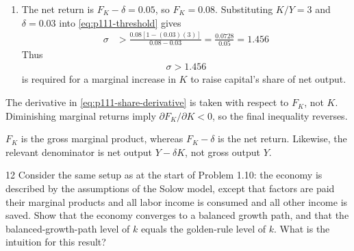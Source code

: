 \begin{solution}
\begin{enumerate}[label=(\alph*)]
    \item The net return is \(F_K-\delta=0.05\), so
    \(F_K=0.08\). Substituting \(K/Y=3\) and \(\delta=0.03\) into
    \eqref{eq:p111-threshold} gives
    \begin{align*}
        \sigma
        &>\frac{0.08[1-(0.03)(3)]}{0.08-0.03}
        =\frac{0.0728}{0.05}
        =1.456
    \end{align*}
    Thus
    \begin{align*}
        \boxed{\sigma>1.456}
    \end{align*}
    is required for a marginal increase in \(K\) to raise capital's share of
    net output.
\end{enumerate}
\end{solution}

\begin{note}
    The derivative in \eqref{eq:p111-share-derivative} is taken with respect
    to \(F_K\), not \(K\). Diminishing marginal returns imply
    \(\partial F_K/\partial K<0\), so the final inequality reverses.
\end{note}

\begin{note}
    \(F_K\) is the gross marginal product, whereas \(F_K-\delta\) is the net
    return. Likewise, the relevant denominator is net output \(Y-\delta K\),
    not gross output \(Y\).
\end{note}

\begin{problem}{12}
Consider the same setup as at the start of Problem 1.10: the economy is described by the assumptions
of the Solow model, except that factors are paid their marginal products and all labor income is
consumed and all other income is saved. Show that the economy converges to a balanced growth path,
and that the balanced-growth-path level of \(k\) equals the golden-rule level of \(k\). What is
the intuition for this result?
\end{problem}

